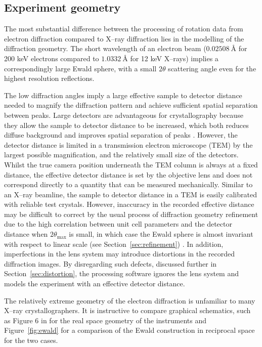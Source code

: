 \documentclass[preprint]{iucr}
\begin{document}
\subsection{Experiment geometry}

The most substantial difference between the processing of rotation data from
electron diffraction compared to X--ray diffraction lies in the modelling of the
diffraction geometry. The short wavelength of an electron beam
($\SI{0.02508}{\angstrom}$ for 200 keV electrons compared to
$\SI{1.0332}{\angstrom}$ for 12 keV X--rays) implies a correspondingly large
Ewald sphere, with a small
$2\theta$ scattering angle even for the highest resolution reflections.

The low diffraction angles imply a large effective sample to detector distance
needed to magnify the diffraction pattern and achieve sufficient spatial
separation between peaks. Large detectors are advantageous for crystallography
because they allow the sample to detector distance to be increased, which both
reduces diffuse background and improves spatial separation of peaks
\cite{Stanton1993}. However, the detector distance is limited in a transmission
electron microscope (TEM) by the largest possible magnification, and the
relatively small size of the detectors. Whilst the true camera position
underneath the TEM column is always at a fixed distance, the effective detector
distance is set by the objective lens and does not correspond directly to a
quantity that can be measured mechanically. Similar to an X--ray beamline, the
sample to detector distance in a TEM is easily calibrated with reliable test
crystals. However, inaccuracy in the recorded effective distance may be
difficult to correct by the usual process of diffraction geometry refinement
due to the high correlation between unit cell parameters and the detector
distance when $2\theta_{\text{max}}$ is small, in which case the Ewald sphere
is almost invariant with respect to linear scale (see
Section~\ref{sec:refinement}) \cite{VanGenderen2016}.  In addition,
imperfections in the lens system may introduce distortions in the recorded
diffraction images. By disregarding such defects, discussed further in
Section~\ref{sec:distortion}, the processing software ignores the lens system
and models the experiment with an effective detector distance.

The relatively
extreme geometry of the electron diffraction is unfamiliar to many X--ray
crystallographers. It is instructive to compare graphical schematics, such as
Figure 6 in  for the real space geometry of the instruments
and Figure~\ref{fig:ewald} for a comparison of the Ewald construction in
reciprocal space for the two cases.
\end{document}
